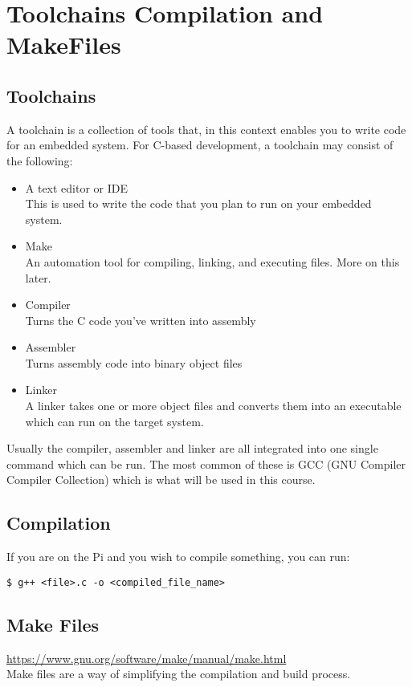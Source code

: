 \section{Toolchains Compilation and MakeFiles}
\label{sec:ToolchainsCompilersMakefiles}
\subsection{Toolchains}
A toolchain is a collection of tools that, in this context enables you to write code for an embedded system. For C-based development, a toolchain may consist of the following:
\begin{itemize}
    \item A text editor or IDE\\
    This is used to write the code that you plan to run on your embedded system.
    \item Make\\
    An automation tool for compiling, linking, and executing files. More on this later.
    \item Compiler\\
    Turns the C code you've written into assembly
    \item Assembler\\
    Turns assembly code into binary object files
    \item Linker\\
    A linker takes one or more object files and converts them into an executable which can run on the target system.
\end{itemize}

Usually the compiler, assembler and linker are all integrated into one single command which can be run. The most common of these is GCC (GNU Compiler Compiler Collection) which is what will be used in this course.

\subsection{Compilation}
If you are on the Pi and you wish to compile something, you can run:
\begin{lstlisting}
$ g++ <file>.c -o <compiled_file_name>
\end{lstlisting}

\subsection{Make Files}
\href{https://www.gnu.org/software/make/manual/make.html}{https://www.gnu.org/software/make/manual/make.html}\\
Make files are a way of simplifying the compilation and build process.

